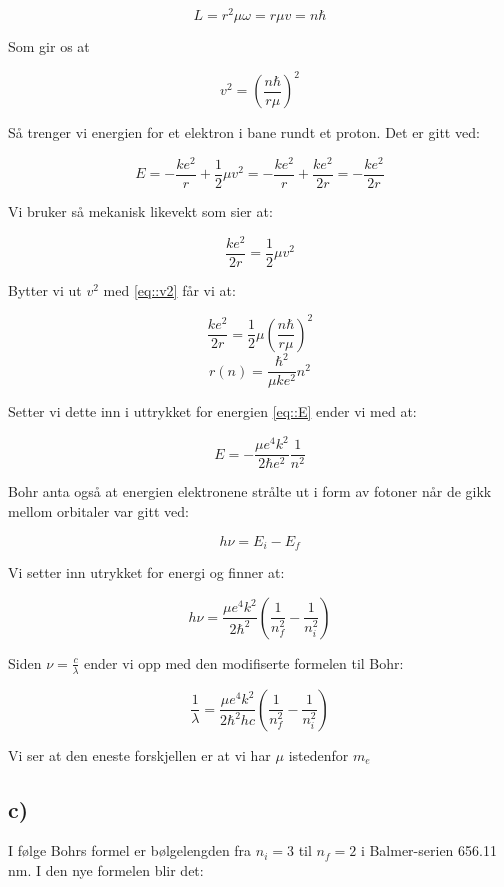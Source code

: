 \documentclass[a4paper,norsk, 10pt]{article}
\begin{document}
$$
L = r^2\mu \omega = r\mu v = n\hbar
$$

Som gir os at

\begin{equation}
v^2 = \left(\frac{n\hbar}{r\mu}\right)^2
\end{equation}\label{eq::v2}

Så trenger vi energien for et elektron i bane rundt et proton. Det er gitt ved:

\begin{equation}
E = -\frac{ke^2}{r} + \frac{1}{2}\mu v^2 = -\frac{ke^2}{r} + \frac{ke^2}{2r} = -\frac{ke^2}{2r}
\end{equation}\label{eq::E}

Vi bruker så mekanisk likevekt som sier at:

\begin{equation}
\frac{ke^2}{2r} = \frac{1}{2}\mu v^2
\end{equation}\label{likevekt}

Bytter vi ut $v^2$ med \ref{eq::v2} får vi at:

$$
\frac{ke^2}{2r} = \frac{1}{2}\mu \left(\frac{n\hbar}{r\mu}\right)^2
$$
\begin{equation}
r(n) = \frac{\hbar^2}{\mu ke^2}n^2
\end{equation}\label{r}

Setter vi dette inn i uttrykket for energien \ref{eq::E} ender vi med at:

$$
E = -\frac{\mu e^4k^2}{2\hbar e^2}\frac{1}{n^2}
$$

Bohr anta også at energien elektronene strålte ut i form av fotoner når de gikk mellom orbitaler var gitt ved:

$$
h\nu = E_i - E_f
$$

Vi setter inn utrykket for energi og finner at:

$$
h\nu = \frac{\mu e^4k^2}{2\hbar^2}\left(\frac{1}{n_f^2}-\frac{1}{n_i^2}\right)
$$

Siden $\nu = \frac{c}{\lambda}$ ender vi opp med den modifiserte formelen til Bohr:

\begin{equation}
\frac{1}{\lambda} = \frac{\mu e^4k^2}{2\hbar^2hc}\left(\frac{1}{n_f^2}-\frac{1}{n_i^2}\right)
\end{equation}\label{eq::enoverlambda}

Vi ser at den eneste forskjellen er at vi har $\mu$ istedenfor $m_e$

\subsection*{c)}
I følge Bohrs formel er bølgelengden fra $n_i = 3$ til $n_f = 2$ i Balmer-serien 656.11 nm. I den nye formelen blir det:
\end{document}
